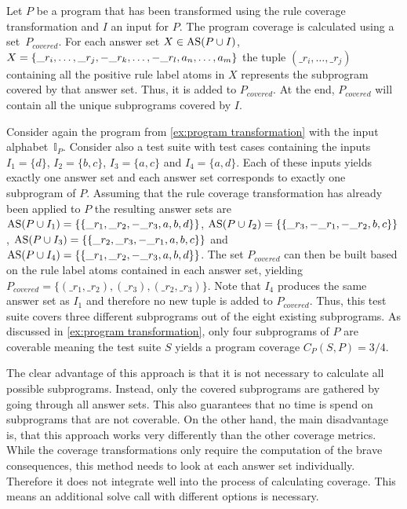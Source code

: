 \begin{definition}
\label{def:program coverage calculation}
    Let $P$ be a program that has been transformed using the rule coverage transformation and $I$ an input for $P$. The program coverage is calculated using a set~$P_{covered}$. For each answer set \(X \in \operatorname{AS}(P \cup I)\), \(X = \{\_r_i, \ldots, \_r_j, -\_r_k, \ldots, -\_r_l, \linebreak a_n, \ldots, a_m\}\) the tuple \((\_r_i, \ldots, \_r_j)\) containing all the positive rule label atoms in $X$ represents the subprogram covered by that answer set. Thus, it is added to $P_{covered}$. At the end, $P_{covered}$ will contain all the unique subprograms covered by $I$.
\end{definition}

\begin{example}
\label{ex:program coverage calculation}
    Consider again the program from \cref{ex:program transformation} with the input alphabet~$\mathbb{I}_P$. Consider also a test suite with test cases containing the inputs \(I_1 = \{d\}\), \(I_2 = \{b, c\}\), \(I_3 = \{a, c\}\) and \(I_4 = \{a, d\}\). Each of these inputs yields exactly one answer set and each answer set corresponds to exactly one subprogram of $P$. Assuming that the rule coverage transformation has already been applied to $P$ the resulting answer sets are \(\operatorname{AS}(P \cup I_1) = \{\{\_r_1, \_r_2, -\_r_3, a, b, d\}\}\), \(\operatorname{AS}(P \cup I_2) = \{\{\_r_3, -\_r_1, -\_r_2, b, c\}\}\), \(\operatorname{AS}(P \cup I_3) = \{\{\_r_2, \_r_3, -\_r_1, a, b, c\}\}\) and \(\operatorname{AS}(P \cup I_4) = \{\{\_r_1, \_r_2, -\_r_3, a, b, d\}\}\). The set $P_{covered}$ can then be built based on the rule label atoms contained in each answer set, yielding \(P_{covered} = \{(\_r_1, \_r_2), (\_r_3), (\_r_2, \_r_3)\}\). Note that $I_4$ produces the same answer set as $I_1$ and therefore no new tuple is added to $P_{covered}$. Thus, this test suite covers three different subprograms out of the eight existing subprograms. As discussed in \cref{ex:program transformation}, only four subprograms of $P$ are coverable meaning the test suite $S$ yields a program coverage \(C_P(S, P) = 3 / 4\).
\end{example}

The clear advantage of this approach is that it is not necessary to calculate all possible subprograms. Instead, only the covered subprograms are gathered by going through all answer sets. This also guarantees that no time is spend on subprograms that are not coverable. On the other hand, the main disadvantage is, that this approach works very differently than the other coverage metrics. While the coverage transformations only require the computation of the brave consequences, this method needs to look at each answer set individually. Therefore it does not integrate well into the process of calculating coverage. This means an additional solve call with different options is necessary. 

